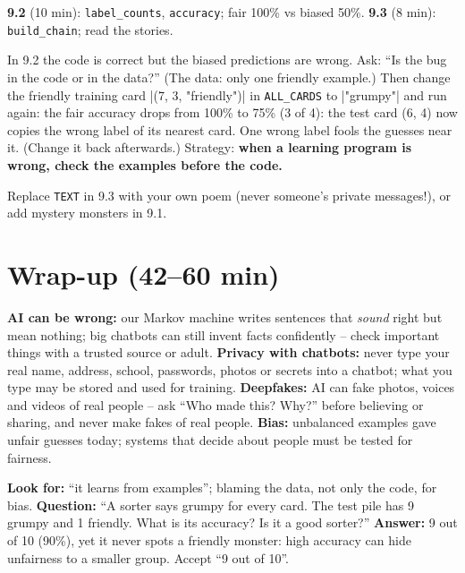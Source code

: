 \textbf{9.2} (10 min): \texttt{label\_counts}, \texttt{accuracy}; fair 100\% vs biased 50\%. \textbf{9.3} (8 min): \texttt{build\_chain}; read the stories.

\begin{bughunt}
In 9.2 the code is correct but the biased predictions are wrong. Ask: \enquote{Is the bug in the code or in the data?} (The data: only one friendly example.) Then change the friendly training card \py|(7, 3, "friendly")| in \texttt{ALL\_CARDS} to \py|"grumpy"| and run again: the fair accuracy drops from 100\% to 75\% (3 of 4): the test card (6, 4) now copies the wrong label of its nearest card. One wrong label fools the guesses near it. (Change it back afterwards.) Strategy: \textbf{when a learning program is wrong, check the examples before the code.}
\end{bughunt}

\begin{freebuild}
Replace \texttt{TEXT} in 9.3 with your own poem (never someone's private messages!), or add mystery monsters in 9.1.
\end{freebuild}

\section{Wrap-up (42--60 min)}
\begin{safety}
\textbf{AI can be wrong:} our Markov machine writes sentences that \emph{sound} right but mean nothing; big chatbots can still invent facts confidently -- check important things with a trusted source or adult.
\textbf{Privacy with chatbots:} never type your real name, address, school, passwords, photos or secrets into a chatbot; what you type may be stored and used for training.
\textbf{Deepfakes:} AI can fake photos, voices and videos of real people -- ask \enquote{Who made this? Why?} before believing or sharing, and never make fakes of real people.
\textbf{Bias:} unbalanced examples gave unfair guesses today; systems that decide about people must be tested for fairness.
\end{safety}

\begin{formativecheck}
\textbf{Look for:} \enquote{it learns from examples}; blaming the data, not only the code, for bias.
\textbf{Question:} \enquote{A sorter says grumpy for every card. The test pile has 9 grumpy and 1 friendly. What is its accuracy? Is it a good sorter?}
\textbf{Answer:} 9 out of 10 (90\%), yet it never spots a friendly monster: high accuracy can hide unfairness to a smaller group. Accept \enquote{9 out of 10}.
\end{formativecheck}

